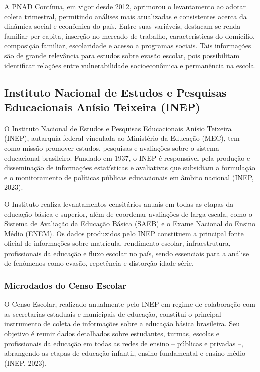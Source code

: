 \documentclass[english, spanish, brazilian]{RBIEarticle} %
\begin{document}
A PNAD Contínua, em vigor desde 2012, aprimorou o levantamento ao adotar coleta trimestral, permitindo análises mais atualizadas e consistentes acerca da dinâmica social e econômica do país. Entre suas variáveis, destacam-se renda familiar per capita, inserção no mercado de trabalho, características do domicílio, composição familiar, escolaridade e acesso a programas sociais. Tais informações são de grande relevância para estudos sobre evasão escolar, pois possibilitam identificar relações entre vulnerabilidade socioeconômica e permanência na escola.

\subsection{Instituto Nacional de Estudos e Pesquisas Educacionais Anísio Teixeira (INEP)}
O Instituto Nacional de Estudos e Pesquisas Educacionais Anísio Teixeira (INEP), autarquia federal vinculada ao Ministério da Educação (MEC), tem como missão promover estudos, pesquisas e avaliações sobre o sistema educacional brasileiro. Fundado em 1937, o INEP é responsável pela produção e disseminação de informações estatísticas e avaliativas que subsidiam a formulação e o monitoramento de políticas públicas educacionais em âmbito nacional (INEP, 2023).

O Instituto realiza levantamentos censitários anuais em todas as etapas da educação básica e superior, além de coordenar avaliações de larga escala, como o Sistema de Avaliação da Educação Básica (SAEB) e o Exame Nacional do Ensino Médio (ENEM). Os dados produzidos pelo INEP constituem a principal fonte oficial de informações sobre matrícula, rendimento escolar, infraestrutura, profissionais da educação e fluxo escolar no país, sendo essenciais para a análise de fenômenos como evasão, repetência e distorção idade-série.

\subsubsection{Microdados do Censo Escolar}
O Censo Escolar, realizado anualmente pelo INEP em regime de colaboração com as secretarias estaduais e municipais de educação, constitui o principal instrumento de coleta de informações sobre a educação básica brasileira. Seu objetivo é reunir dados detalhados sobre estudantes, turmas, escolas e profissionais da educação em todas as redes de ensino – públicas e privadas –, abrangendo as etapas de educação infantil, ensino fundamental e ensino médio (INEP, 2023).
\end{document}
